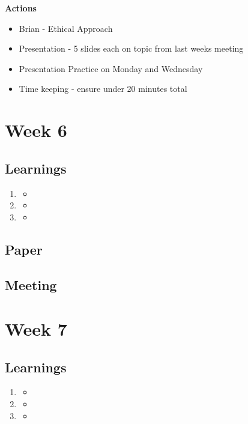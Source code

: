 \textbf{Actions}
\begin{itemize}
\item Brian - Ethical Approach
\item Presentation - 5 slides each on topic from last weeks meeting
\item Presentation Practice on Monday and Wednesday
\item Time keeping - ensure under 20 minutes total
\end{itemize}


\chapter{Week 6}

\section{Learnings}
\begin{enumerate}
\item
\begin{itemize}
\item
\end{itemize}
\item
\begin{itemize}
\item
\end{itemize}
\item
\begin{itemize}
\item
\end{itemize}
\end{enumerate}

\section{Paper}

\section{Meeting}

\chapter{Week 7}

\section{Learnings}
\begin{enumerate}
\item
\begin{itemize}
\item
\end{itemize}
\item
\begin{itemize}
\item
\end{itemize}
\item
\begin{itemize}
\item
\end{itemize}
\end{enumerate}

